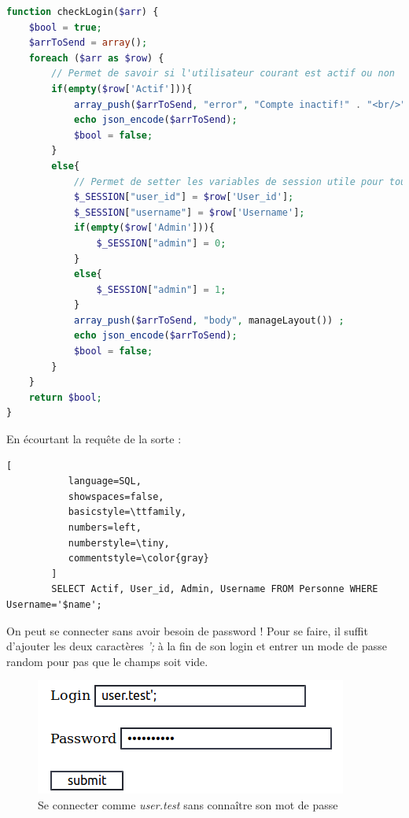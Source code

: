 \documentclass[12pt]{article}
\begin{document}
\begin{lstlisting}[language=PHP]
function checkLogin($arr) {
    $bool = true;
    $arrToSend = array();
    foreach ($arr as $row) {
        // Permet de savoir si l'utilisateur courant est actif ou non
        if(empty($row['Actif'])){
            array_push($arrToSend, "error", "Compte inactif!" . "<br/>") ;
            echo json_encode($arrToSend);
            $bool = false;
        }
        else{
            // Permet de setter les variables de session utile pour toute la connection
            $_SESSION["user_id"] = $row['User_id'];
            $_SESSION["username"] = $row['Username'];
            if(empty($row['Admin'])){
                $_SESSION["admin"] = 0;
            }
            else{
                $_SESSION["admin"] = 1;
            }
            array_push($arrToSend, "body", manageLayout()) ;
            echo json_encode($arrToSend);
            $bool = false;
        }
    }
    return $bool;
}
\end{lstlisting}

En écourtant la requête de la sorte : 

\begin{lstlisting}[
           language=SQL,
           showspaces=false,
           basicstyle=\ttfamily,
           numbers=left,
           numberstyle=\tiny,
           commentstyle=\color{gray}
        ]
        SELECT Actif, User_id, Admin, Username FROM Personne WHERE Username='$name';
\end{lstlisting}

On peut se connecter sans avoir besoin de password ! Pour se faire, il suffit d'ajouter les deux caractères \textit{';} à la fin de son login et entrer un mode de passe random pour pas que le champs soit vide.

\begin{figure}[H]
\centering
\includegraphics[width=\linewidth]{images/sqliLogin.png}
\caption{Se connecter comme \textit{user.test} sans connaître son mot de passe}
\end{figure}
\end{document}
